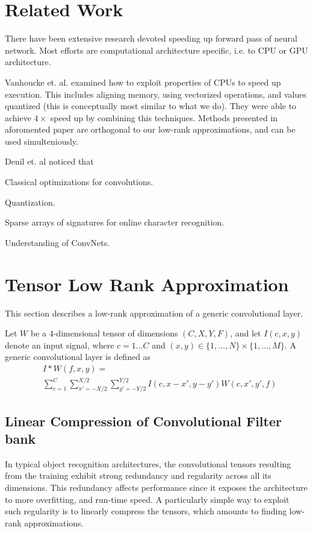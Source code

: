 \documentclass{article}
\begin{document}
\section{Related Work}
There have been extensive research devoted speeding up forward pass of neural network. 
Most efforts are computational architecture specific, i.e. to CPU or GPU architecture.



Vanhoucke et. al. examined how to exploit properties of CPUs to speed up execution.
This includes aligning memory, using vectorized operations, and values quantized 
(this is conceptually most similar to what we do). They were able to achieve $4 \times$ speed up
by combining this techniques. Methods presented in aforomented paper are orthogonal to 
our low-rank approximations, and can be used simulteniously. 





Denil et. al \cite{denil2013predicting} noticed that 

Classical optimizations for convolutions. 

Quantization.

Sparse arrays of signatures for online character
recognition.

Understanding of ConvNets. 


\section{Tensor Low Rank Approximation}

This section describes a low-rank approximation of a generic 
convolutional layer. 

Let $W$ be a $4$-dimensional tensor of dimensions $(C,X,Y,F)$,
and let $I(c,x,y)$ denote an input signal, 
where $c=1\dots C$ and $(x,y) \in \{1,\dots,N\}\times \{1,\dots,M\}$.
A generic convolutional layer is defined as
\begin{align*}
\label{convlayereq}
&I \ast W (f,x,y) = \\
&\sum_{c=1}^C \sum_{x'=-X/2}^{X/2} \sum_{y'=-Y/2}^{Y/2} I(c,x-x',y-y') W(c,x',y',f)
\end{align*}

\subsection{Linear Compression of Convolutional Filter bank}

In typical object recognition architectures, the convolutional tensors resulting
from the training exhibit strong redundancy and regularity across all its 
dimensions. This redundancy affects performance since it exposes
the architecture to more overfitting, and run-time speed. 
A particularly simple way to exploit such regularity is to 
linearly compress the tensors, which amounts to finding low-rank 
approximations.
\end{document}
